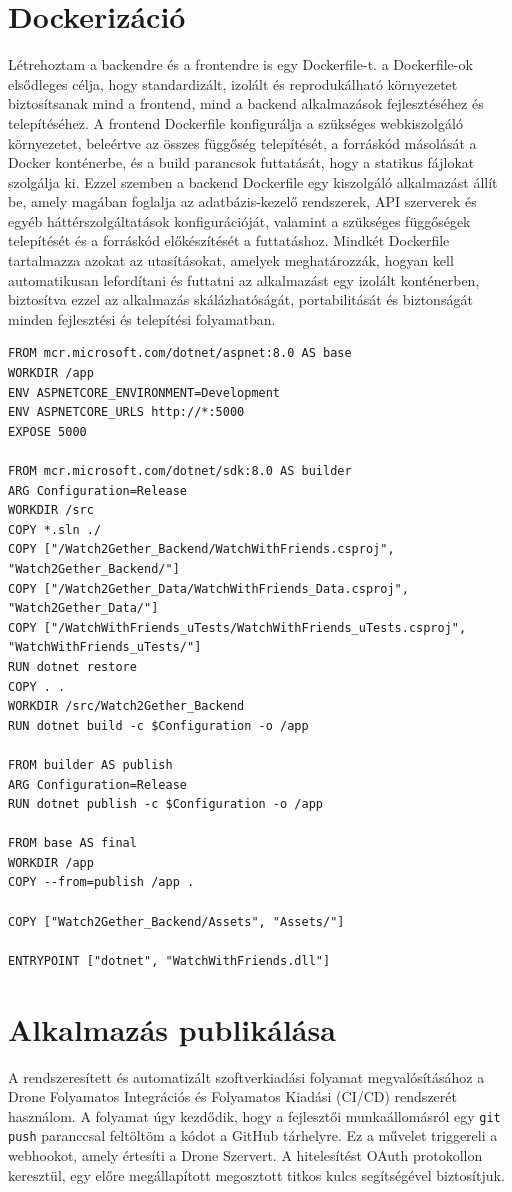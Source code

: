 \section{Dockerizáció}
Létrehoztam a backendre és a frontendre is egy Dockerfile-t. a Dockerfile-ok elsődleges célja, hogy standardizált, izolált és reprodukálható környezetet biztosítsanak mind a frontend, mind a backend alkalmazások fejlesztéséhez és telepítéséhez. A frontend Dockerfile konfigurálja a szükséges webkiszolgáló környezetet, beleértve az összes függőség telepítését, a forráskód másolását a Docker konténerbe, és a build parancsok futtatását, hogy a statikus fájlokat szolgálja ki. Ezzel szemben a backend Dockerfile egy kiszolgáló alkalmazást állít be, amely magában foglalja az adatbázis-kezelő rendszerek, API szerverek és egyéb háttérszolgáltatások konfigurációját, valamint a szükséges függőségek telepítését és a forráskód előkészítését a futtatáshoz. Mindkét Dockerfile tartalmazza azokat az utasításokat, amelyek meghatározzák, hogyan kell automatikusan lefordítani és futtatni az alkalmazást egy izolált konténerben, biztosítva ezzel az alkalmazás skálázhatóságát, portabilitását és biztonságát minden fejlesztési és telepítési folyamatban.
\begin{lstlisting}[language=CSharp,style=CSharpBase,caption={A backend Dockerfile-ja}]
FROM mcr.microsoft.com/dotnet/aspnet:8.0 AS base
WORKDIR /app
ENV ASPNETCORE_ENVIRONMENT=Development
ENV ASPNETCORE_URLS http://*:5000
EXPOSE 5000

FROM mcr.microsoft.com/dotnet/sdk:8.0 AS builder
ARG Configuration=Release
WORKDIR /src
COPY *.sln ./
COPY ["/Watch2Gether_Backend/WatchWithFriends.csproj",
"Watch2Gether_Backend/"]
COPY ["/Watch2Gether_Data/WatchWithFriends_Data.csproj",
"Watch2Gether_Data/"]
COPY ["/WatchWithFriends_uTests/WatchWithFriends_uTests.csproj",
"WatchWithFriends_uTests/"]
RUN dotnet restore
COPY . .
WORKDIR /src/Watch2Gether_Backend
RUN dotnet build -c $Configuration -o /app

FROM builder AS publish
ARG Configuration=Release
RUN dotnet publish -c $Configuration -o /app

FROM base AS final
WORKDIR /app
COPY --from=publish /app .

COPY ["Watch2Gether_Backend/Assets", "Assets/"]

ENTRYPOINT ["dotnet", "WatchWithFriends.dll"]
\end{lstlisting}

\section{Alkalmazás publikálása}
A rendszeresített és automatizált szoftverkiadási folyamat megvalósításához a Drone Folyamatos Integrációs és Folyamatos Kiadási (CI/CD) rendszerét használom. A folyamat úgy kezdődik, hogy a fejlesztői munkaállomásról egy \texttt{git push} paranccsal feltöltöm a kódot a GitHub tárhelyre. Ez a művelet triggereli a webhookot, amely értesíti a Drone Szervert. A hitelesítést OAuth protokollon keresztül, egy előre megállapított megosztott titkos kulcs segítségével biztosítjuk.

